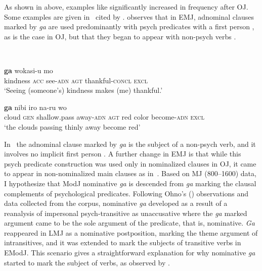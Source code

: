 \documentclass[output=paper]{LSP/langsci}
\begin{document}
As shown in  above, examples like  significantly increased in frequency after OJ. Some examples are given in~ cited by \citet[142]{Ohno1977Development}. \citet{Ohno1977Development,Ohno1987Bunpo} observes that in EMJ, adnominal clauses marked by \textit{ga} are used predominantly with psych predicates with a first person  , as is the case in OJ, but that they began to appear with non-psych  verbs . 

\begin{exe}
\ex%
\label{14-ya-ex:27}
\\ 
\begin{xlist}
\ex
\label{14-ya-ex:27a}
\gll [kokorobape wo mi-ru] \textbf{ga} wokasi-u mo\\ %
kindness \textsc{acc} see-\textsc{adn} \textsc{agt} thankful-\textsc{concl} \textsc{excl}\\
\glt ‘Seeing (someone’s) kindness makes (me) thankful.’

\ex
\label{14-ya-ex:27b}
 \textbf{ga} nibi iro na-ru wo\\ %
cloud \textsc{gen} shallow.pass away-\textsc{adn} \textsc{agt} red color become-\textsc{adn} \textsc{excl}\\
\glt ‘the clouds passing thinly away become red’
\end{xlist}
\end{exe}


In~ the adnominal clause marked by \textit{ga} is the subject of a non-psych  verb, and it involves no implicit first person . A further change in EMJ is that while this psych predicate construction was used only in nominalized clauses in OJ, it came to appear in non-nominalized main clauses as in~. Based on MJ (800–1600) data, I hypothesize that ModJ nominative \textit{ga} is descended from \textit{ga} marking the clausal complements of psychological predicates. Following Ohno's (\citeyear{Ohno1977Development,Ohno1987Bunpo}) observations and data collected from the corpus, nominative \textit{ga} developed as a result of a reanalysis of impersonal psych-transitive as unaccusative  where the \textit{ga} marked argument came to be the sole argument of the predicate, that is, nominative. \textit{Ga} reappeared in LMJ as a nominative postposition, marking the theme argument of intransitives, and it was extended to mark the subjects of transitive verbs in EModJ. This scenario gives a straightforward explanation for why nominative \textit{ga} started to mark the subject of  verbs, as observed by \citet{Yamada2000Expansion}.
\end{document}
